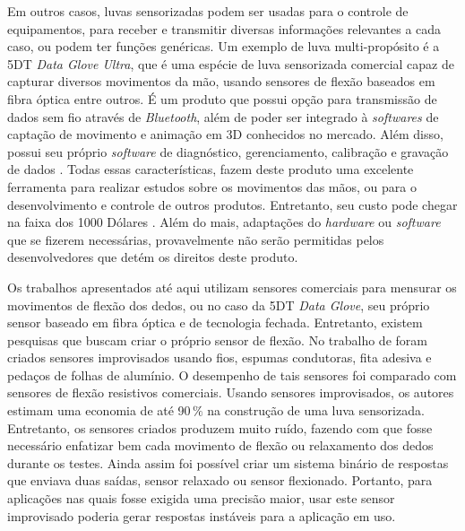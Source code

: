 \documentclass[
	12pt,				%
	openright,			%
	oneside,			%
	a4paper,			%
	english,			%
	brazil				%
	]{abntex2}
\begin{document}
		Em outros casos, luvas sensorizadas podem ser usadas para o controle de equipamentos, para receber e transmitir diversas informações relevantes a cada caso, ou podem ter funções genéricas. Um exemplo de luva multi-propósito é a 5DT \textit{Data Glove Ultra}, que é uma espécie de luva sensorizada comercial capaz de capturar diversos movimentos da mão, usando sensores de flexão baseados em fibra óptica entre outros. É um produto que possui opção para transmissão de dados sem fio através de \textit{Bluetooth}, além de poder ser integrado à \textit{softwares} de captação de movimento e animação em 3D conhecidos no mercado. Além disso, possui seu próprio \textit{software} de diagnóstico, gerenciamento, calibração e gravação de dados \cite{5DT-ultra}. Todas essas características, fazem deste produto uma excelente ferramenta para realizar estudos sobre os movimentos das mãos, ou para o desenvolvimento e controle de outros produtos. Entretanto, seu custo pode chegar na faixa dos 1000 Dólares \cite{5DT-glove2019ebay}. Além do mais, adaptações do \textit{hardware} ou \textit{software} que se fizerem necessárias, provavelmente não serão permitidas pelos desenvolvedores que detém os direitos deste produto.

		Os trabalhos apresentados até aqui utilizam sensores comerciais para mensurar os movimentos de flexão dos dedos, ou no caso da 5DT \textit{Data Glove}, seu próprio sensor baseado em fibra óptica e de tecnologia fechada. Entretanto, existem pesquisas que buscam criar o próprio sensor de flexão. No trabalho de \cite{flores2014glovecontroller} foram criados sensores improvisados usando fios, espumas condutoras, fita adesiva e pedaços de folhas de alumínio. O desempenho de tais sensores foi comparado com sensores de flexão resistivos comerciais. Usando sensores improvisados, os autores estimam uma economia de até 90$\,\%$ na construção de uma luva sensorizada. Entretanto, os sensores criados produzem muito ruído, fazendo com que fosse necessário enfatizar bem cada movimento de flexão ou relaxamento dos dedos durante os testes. Ainda assim foi possível criar um sistema binário de respostas que enviava duas saídas, sensor relaxado ou sensor flexionado. Portanto, para aplicações nas quais fosse exigida uma precisão maior, usar este sensor improvisado poderia gerar respostas instáveis para a aplicação em uso.


\end{document}
